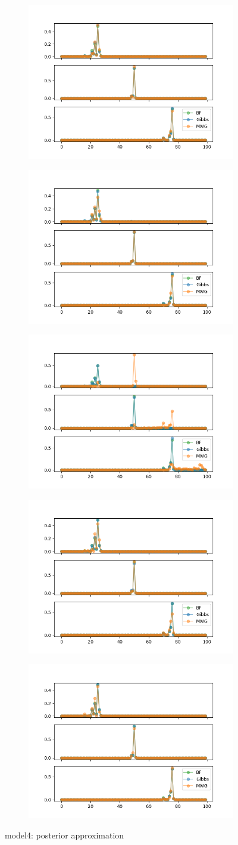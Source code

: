 \begin{figure}[h]
    \centering
    \begin{subfigure}
    	\centering
        \includegraphics[width=0.3\linewidth]{../../plots/Posterior_M4_N100_NMCMC3_seed0_diffind2.png}
    \end{subfigure}
    \begin{subfigure}
        \centering
    	\includegraphics[width=0.3\linewidth]{../../plots/Posterior_M4_N100_NMCMC3_seed1_diffind2.png}
	\end{subfigure}
	\begin{subfigure}
	    \centering
    	\includegraphics[width=0.3\linewidth]{../../plots/Posterior_M4_N100_NMCMC3_seed2_diffind2.png}
	\end{subfigure}
	\begin{subfigure}
	    \centering
    	\includegraphics[width=0.3\linewidth]{../../plots/Posterior_M4_N100_NMCMC3_seed3_diffind2.png}
	\end{subfigure}
	\begin{subfigure}
	    \centering
    	\includegraphics[width=0.3\linewidth]{../../plots/Posterior_M4_N100_NMCMC3_seed4_diffind2.png}
	\end{subfigure}
	\caption{model4: posterior approximation}
\end{figure}

